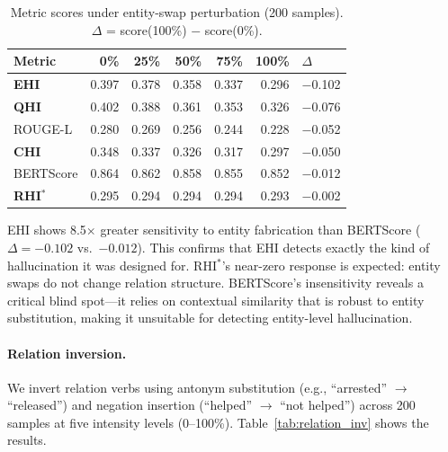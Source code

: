 \documentclass[11pt]{article}
\begin{document}
\begin{table}[h]
\centering
\caption{Metric scores under entity-swap perturbation (200 samples). $\Delta$ = score(100\%) $-$ score(0\%).}
\label{tab:robustness}
\begin{tabular}{lrrrrrl}
\toprule
\textbf{Metric} & \textbf{0\%} & \textbf{25\%} & \textbf{50\%} & \textbf{75\%} & \textbf{100\%} & \textbf{$\Delta$} \\
\midrule
\textbf{EHI} & 0.397 & 0.378 & 0.358 & 0.337 & 0.296 & $-$0.102 \\
\textbf{QHI} & 0.402 & 0.388 & 0.361 & 0.353 & 0.326 & $-$0.076 \\
ROUGE-L & 0.280 & 0.269 & 0.256 & 0.244 & 0.228 & $-$0.052 \\
\textbf{CHI} & 0.348 & 0.337 & 0.326 & 0.317 & 0.297 & $-$0.050 \\
BERTScore & 0.864 & 0.862 & 0.858 & 0.855 & 0.852 & $-$0.012 \\
\textbf{RHI$^*$} & 0.295 & 0.294 & 0.294 & 0.294 & 0.293 & $-$0.002 \\
\bottomrule
\end{tabular}
\end{table}

EHI shows 8.5$\times$ greater sensitivity to entity fabrication than BERTScore ($\Delta=-0.102$ vs.\ $-0.012$). This confirms that EHI detects exactly the kind of hallucination it was designed for. RHI$^*$'s near-zero response is expected: entity swaps do not change relation structure. BERTScore's insensitivity reveals a critical blind spot---it relies on contextual similarity that is robust to entity substitution, making it unsuitable for detecting entity-level hallucination.

\paragraph{Relation inversion.} We invert relation verbs using antonym substitution (e.g., ``arrested'' $\to$ ``released'') and negation insertion (``helped'' $\to$ ``not helped'') across 200 samples at five intensity levels (0--100\%). Table~\ref{tab:relation_inv} shows the results.
\end{document}
